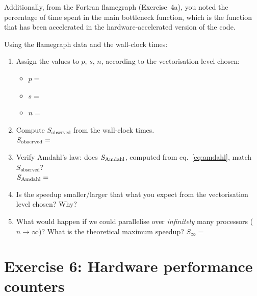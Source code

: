 \documentclass[11pt,a4paper]{article}
\begin{document}
Additionally, from the Fortran flamegraph (Exercise~4a), you noted the percentage of time spent in the main bottleneck function, which is the function that has been accelerated in the hardware-accelerated version of the code.

\begin{exercisebox}[Exercise 5]
Using the flamegraph data and the wall-clock times:
\begin{enumerate}
    \item Assign the values to $p$, $s$, $n$, according to the vectorisation level chosen:
    \begin{itemize}[nosep]
        \item $p = $ \TextField[name=p, width=1.5cm]{}
        \item $s = $ \TextField[name=s, width=1.5cm]{}
        \item $n = $ \TextField[name=n, width=1.5cm]{}
    \end{itemize}
    \item Compute $S_{\text{observed}}$ from the wall-clock times.\\ $S_\textup{observed} = $ \TextField[name=s_observed, width=1.5cm]{}
    \item Verify Amdahl's law: does $S_\textup{Amdahl}$, computed from eq.~\eqref{eq:amdahl}, match $S_{\text{observed}}$?\\ $S_\textup{Amdahl} = $ \TextField[name=s, width=1.5cm]{}
    \item Is the speedup smaller/larger that what you expect from the vectorisation level chosen? Why?
    \item What would happen if we could parallelise over \emph{infinitely} many processors ($n \to \infty$)? What is the theoretical maximum speedup? $S_\infty = $ \TextField[name=s, width=1.5cm]{}
\end{enumerate}

\vspace{3mm}

\TextField[name=exercise_5_notes, height=3cm, width=\linewidth, multiline, value={...notes...}]{}
\end{exercisebox}

\section{Exercise 6: Hardware performance counters}
\label{sec:perfstat}
\end{document}
